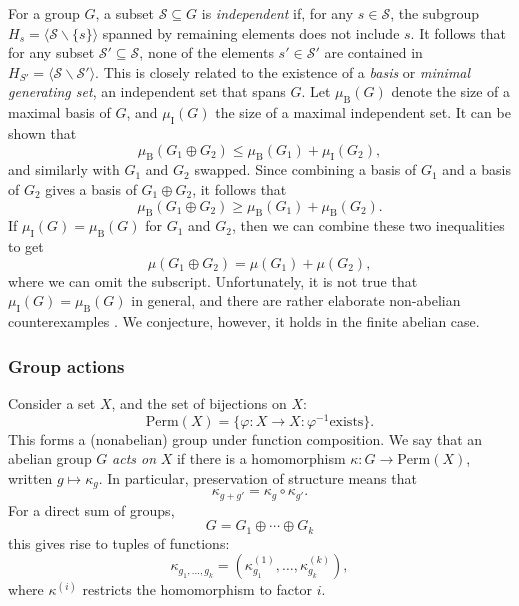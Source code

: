 \documentclass[aps, pre,reprint,nofootinbib,citeautoscript,floatfix]{revtex4-1}
\begin{document}
For a group $G$, a subset $\mathcal{S} \subseteq G$ is \emph{independent} if,
for any $s\in \mathcal{S}$, the subgroup $H_s = \langle \mathcal{S}\backslash
\{s\}\rangle$ spanned by remaining elements does not include $s$.
It follows that for any subset $\mathcal{S}' \subseteq \mathcal{S}$, none of the elements
$s' \in \mathcal{S}'$ are contained in $H_{S'} = \langle \mathcal{S}\backslash \mathcal{S}'\rangle$.
This is closely related to the existence of a \emph{basis} or \emph{minimal
  generating set}, an independent set that spans $G$.
Let $\mu_\text{B}(G)$ denote the size of a maximal basis of
$G$, and $\mu_\text{I}(G)$ the
size of a maximal independent set.
It can be shown \cite{CAMERON2002641} that
\begin{equation}
  \label{eq:61}
  \mu_\text{B}(G_1 \oplus G_2) \leq \mu_\text{B}(G_1) + \mu_\text{I}(G_2),
\end{equation}
and similarly with $G_1$ and $G_2$ swapped.
Since combining a basis of $G_1$ and a basis of $G_2$ gives a basis of
$G_1 \oplus G_2$, it follows that
\begin{equation}
  \label{eq:64}
  \mu_\text{B}(G_1 \oplus G_2) \geq \mu_\text{B}(G_1) + \mu_\text{B}(G_2).
\end{equation}
If $\mu_\text{I}(G) = \mu_\text{B}(G)$ for $G_1$ and $G_2$, then we
can combine these two inequalities to get
\begin{equation}
  \label{eq:conj}
  \mu(G_1 \oplus G_2) =\mu(G_1) + \mu(G_2),
\end{equation}
where we can omit the subscript.
Unfortunately, it is not true that $\mu_\text{I}(G) =
\mu_\text{B}(G)$ in general, and there are rather elaborate non-abelian
counterexamples \cite{WHISTON2002651}.
We conjecture, however, it holds in the finite abelian case.

\subsubsection*{Group actions}
\label{sec:group-actions}

Consider a set $X$, and the set of bijections on $X$:
\begin{equation}
  \text{Perm}(X) = \{ \varphi: X \to X : \varphi^{-1} \text{
    exists}\}.\label{eq:117}
\end{equation}
This forms a (nonabelian) group under function composition.
We say that an abelian group $G$ \emph{acts on} $X$ if there is a homomorphism
$\kappa: G \to \text{Perm}(X)$, written $g \mapsto \kappa_g$.
In particular, preservation of structure means that
\[
  \kappa_{g + g'} = \kappa_g \circ \kappa_{g'}.
\]
For a direct sum of groups,
\[
  G = G_1 \oplus \cdots \oplus G_k
\]
this gives rise to tuples of functions:
\[
  \kappa_{g_1, \ldots, g_k} = (\kappa^{(1)}_{g_1}, \ldots, \kappa^{(k)}_{g_k}),
\]
where $\kappa^{(i)}$ restricts the homomorphism to factor $i$.
\end{document}
